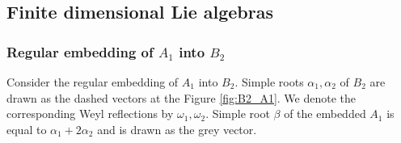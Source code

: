 \documentclass[a4paper,12pt]{article}
\theoremstyle{definition} \newtheorem{Def}{Definition}
\begin{document}
\subsection{Finite dimensional Lie algebras}
\label{sec:finite-dimens-lie}

\subsubsection{Regular embedding of $A_1$ into $B_2$}
\label{sec:regul-embedd-a_1}

Consider the regular embedding of $A_1$ into $B_2$. Simple roots $\alpha_1, \alpha_2$ of $B_2$ are drawn as the dashed vectors at the Figure \ref{fig:B2_A1}. We denote the corresponding Weyl reflections by $\omega_1, \omega_2$. Simple root $\beta$ of the embedded $A_1$ is equal to $\alpha_1+2\alpha_2$ and is drawn as the grey vector.
\end{document}
